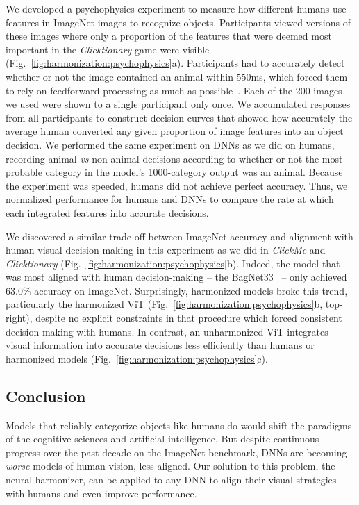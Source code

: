We developed a psychophysics experiment to measure how different humans use features in ImageNet images to recognize objects. Participants viewed versions of these images where only a proportion of the features that were deemed most important in the \textit{Clicktionary} game were visible (Fig.~\ref{fig:harmonization:psychophysics}a). Participants had to accurately detect whether or not the image contained an animal within 550ms, which forced them to rely on feedforward processing as much as possible~\cite{Serre2007-hq}. Each of the 200 images we used were shown to a single participant only once. We accumulated responses from all participants to construct decision curves that showed how accurately the average human converted any given proportion of image features into an object decision. We performed the same experiment on DNNs as we did on humans, recording animal \textit{vs} non-animal decisions according to whether or not the most probable category in the model's 1000-category output was an animal. Because the experiment was speeded, humans did not achieve perfect accuracy. Thus, we normalized performance for humans and DNNs to compare the rate at which each integrated features into accurate decisions.

We discovered a similar trade-off between ImageNet accuracy and alignment with human visual decision making in this experiment as we did in \textit{ClickMe} and \textit{Clicktionary} (Fig.~\ref{fig:harmonization:psychophysics}b). Indeed, the model that was most aligned with human decision-making -- the BagNet33~\cite{Brendel2019-mw} -- only achieved 63.0\% accuracy on ImageNet. Surprisingly, harmonized models broke this trend, particularly the harmonized ViT (Fig.~\ref{fig:harmonization:psychophysics}b, top-right), despite no explicit constraints in that procedure which forced consistent decision-making with humans. In contrast, an unharmonized ViT integrates visual information into accurate decisions less efficiently than humans or harmonized models (Fig.~\ref{fig:harmonization:psychophysics}c).

\subsection{Conclusion}
Models that reliably categorize objects like humans do would shift the paradigms of the cognitive sciences and artificial intelligence. But despite continuous progress over the past decade on the ImageNet benchmark, DNNs are becoming \textit{worse} models of human vision, less aligned. Our solution to this problem, the neural harmonizer, can be applied to any DNN to align their visual strategies with humans and even improve performance.

